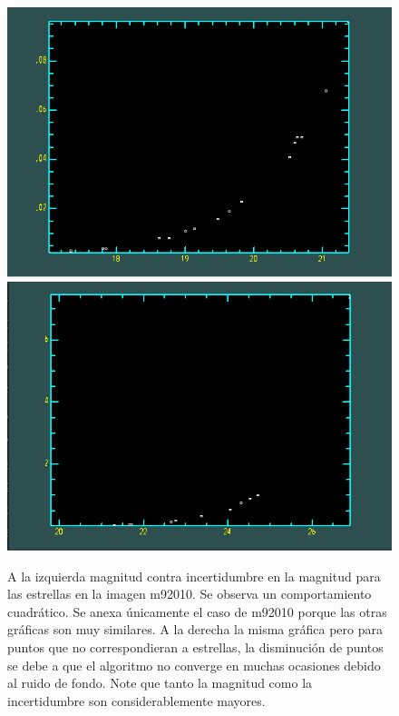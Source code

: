 \documentclass[12pt]{article}
\begin{document}
\begin{figure}[H]
   \includegraphics[scale=0.4]{mvsdm0.png}
   \includegraphics[scale=0.4]{mvsdm1.png}

  \caption{ A la izquierda magnitud contra incertidumbre en la magnitud para las estrellas en la imagen m92010. Se observa un comportamiento cuadrático. Se anexa únicamente el caso de m92010 porque las otras gráficas son muy similares. A la derecha la misma gráfica pero para puntos que no correspondieran a estrellas, la disminución de puntos se debe a que el algoritmo no converge en muchas ocasiones debido al ruido de fondo. Note que tanto la magnitud como la incertidumbre son considerablemente mayores.}
  \label{im5}
\end{figure}






%
\end{document}
